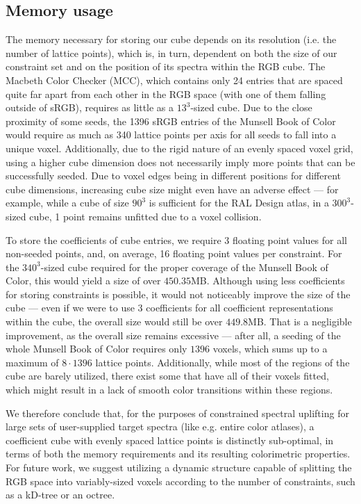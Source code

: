 \subsection{Memory usage}
The memory necessary for storing our cube depends on its resolution (i.e. the number of lattice points), which is, in turn, dependent on both the size of our constraint set and on the position of its spectra within the RGB cube. The Macbeth Color Checker (MCC), which contains only 24 entries that are spaced quite far apart from each other in the RGB space (with one of them falling outside of sRGB), requires as little as a $13^3$-sized cube. Due to the close proximity of some seeds, the 1396 sRGB entries of the Munsell Book of Color would require as much as 340 lattice points per axis for all seeds to fall into a unique voxel. Additionally, due to the rigid nature of an evenly spaced voxel grid, using a higher cube dimension does not necessarily imply more points that can be successfully seeded. Due to voxel edges being in different positions for different cube dimensions, increasing cube size might even have an adverse effect --- for example, while a cube of size $90^3$ is sufficient for the RAL Design atlas, in a $300^3$-sized cube, 1 point remains unfitted due to a voxel collision.

To store the coefficients of cube entries, we require 3 floating point values for all non-seeded points, and, on average, 16 floating point values per constraint. For the $340^3$-sized cube required for the proper coverage of the Munsell Book of Color, this would yield a size of over $450.35$MB. Although using less coefficients for storing constraints is possible, it would not noticeably improve the size of the cube --- even if we were to use 3 coefficients for all coefficient representations within the cube, the overall size would still be over $449.8$MB. That is a negligible improvement, as the overall size remains excessive --- after all, a seeding of the whole Munsell Book of Color requires only $1396$ voxels, which sums up to a maximum of $8\cdot1396$ lattice points. Additionally, while most of the regions of the cube are barely utilized, there exist some that have all of their voxels fitted, which might result in a lack of smooth color transitions within these regions.

We therefore conclude that, for the purposes of constrained spectral uplifting for large sets of user-supplied target spectra (like e.g. entire color atlases), a coefficient cube with evenly spaced lattice points is distinctly sub-optimal, in terms of both the memory requirements and its resulting colorimetric properties. For future work, we suggest utilizing a dynamic structure capable of splitting the RGB space into variably-sized voxels according to the number of constraints, such as a kD-tree or an octree.

